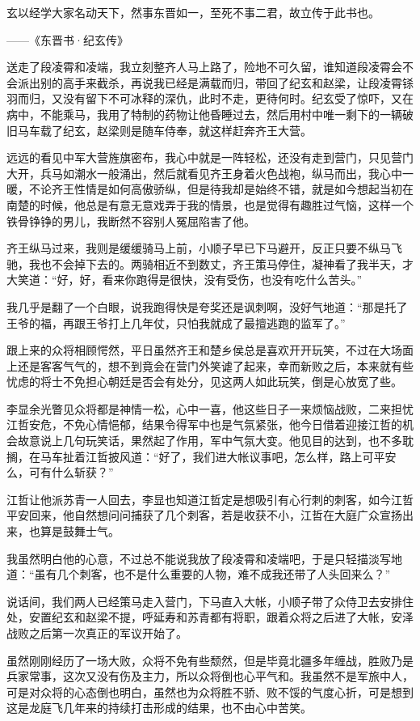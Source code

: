 玄以经学大家名动天下，然事东晋如一，至死不事二君，故立传于此书也。

——《东晋书·纪玄传》

送走了段凌霄和凌端，我立刻整齐人马上路了，险地不可久留，谁知道段凌霄会不会派出别的高手来截杀，再说我已经是满载而归，带回了纪玄和赵梁，让段凌霄铩羽而归，又没有留下不可冰释的深仇，此时不走，更待何时。纪玄受了惊吓，又在病中，不能乘马，我用了特制的药物让他昏睡过去，然后用村中唯一剩下的一辆破旧马车载了纪玄，赵梁则是随车侍奉，就这样赶奔齐王大营。

远远的看见中军大营旌旗密布，我心中就是一阵轻松，还没有走到营门，只见营门大开，兵马如潮水一般涌出，然后就看见齐王身着火色战袍，纵马而出，我心中一暖，不论齐王性情是如何高傲骄纵，但是待我却是始终不错，就是如今想起当初在南楚的时候，他总是有意无意戏弄于我的情景，也是觉得有趣胜过气恼，这样一个铁骨铮铮的男儿，我断然不容别人冤屈陷害了他。

齐王纵马过来，我则是缓缓骑马上前，小顺子早已下马避开，反正只要不纵马飞驰，我也不会掉下去的。两骑相近不到数丈，齐王策马停住，凝神看了我半天，才大笑道：“好，好，看来你跑得是很快，没有受伤，也没有吃什么苦头。”

我几乎是翻了一个白眼，说我跑得快是夸奖还是讽刺啊，没好气地道：“那是托了王爷的福，再跟王爷打上几年仗，只怕我就成了最擅逃跑的监军了。”

跟上来的众将相顾愕然，平日虽然齐王和楚乡侯总是喜欢开开玩笑，不过在大场面上还是客客气气的，想不到竟会在营门外笑谑了起来，幸而新败之后，本来就有些忧虑的将士不免担心朝廷是否会有处分，见这两人如此玩笑，倒是心放宽了些。

李显余光瞥见众将都是神情一松，心中一喜，他这些日子一来烦恼战败，二来担忧江哲安危，不免心情悒郁，结果令得军中也是气氛紧张，他今日借着迎接江哲的机会故意说上几句玩笑话，果然起了作用，军中气氛大变。他见目的达到，也不多耽搁，在马车扯着江哲披风道：“好了，我们进大帐议事吧，怎么样，路上可平安么，可有什么斩获？”

江哲让他派苏青一人回去，李显也知道江哲定是想吸引有心行刺的刺客，如今江哲平安回来，他自然想问问捕获了几个刺客，若是收获不小，江哲在大庭广众宣扬出来，也算是鼓舞士气。

我虽然明白他的心意，不过总不能说我放了段凌霄和凌端吧，于是只轻描淡写地道：“虽有几个刺客，也不是什么重要的人物，难不成我还带了人头回来么？”

说话间，我们两人已经策马走入营门，下马直入大帐，小顺子带了众侍卫去安排住处，安置纪玄和赵梁不提，呼延寿和苏青都有将职，跟着众将之后进了大帐，安泽战败之后第一次真正的军议开始了。

虽然刚刚经历了一场大败，众将不免有些颓然，但是毕竟北疆多年缠战，胜败乃是兵家常事，这次又没有伤及主力，所以众将倒也心平气和。我虽然不是军旅中人，可是对众将的心态倒也明白，虽然也为众将胜不骄、败不馁的气度心折，可是想到这是龙庭飞几年来的持续打击形成的结果，也不由心中苦笑。

